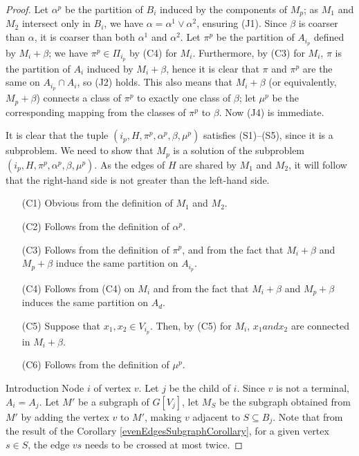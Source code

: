 \begin{proof}
Let \(\alpha^p\) be the partition of \(B_i\) induced by the components of \(M_p\); as \(M_1\) and \(M_2\) intersect only in \(B_i\), we have \(\alpha = \alpha^1 \vee \alpha^2\), ensuring (J1). Since \(\beta\) is coarser than \(\alpha\), it is coarser than both \(\alpha^1\) and \(\alpha^2\). Let \(\pi^p\) be the partition of \(A_{i_p}\) defined by \(M_i + \beta\); we have \(\pi^p \in \Pi_{i_p}\) by (C4) for \(M_i\). Furthermore, by (C3) for \(M_i\), \(\pi\) is the partition of \(A_i\) induced by \(M_i + \beta\), hence it is clear that \(\pi\) and \(\pi^p\) are the same on \(A_{i_p} \cap A_i\), so (J2) holds. This also means that \(M_i + \beta\) (or equivalently, \(M_p + \beta\)) connects a class of \(\pi^p\) to exactly one class of \(\beta\); let \(\mu^p\) be the corresponding mapping from the classes of \(\pi^p\) to \(\beta\). Now (J4) is immediate.

It is clear that the tuple \((i_p, H, \pi^p, \alpha^p, \beta, \mu^p)\) satisfies (S1)–(S5), since it is a subproblem. We need to show that \(M_p\) is a solution of the subproblem \((i_p, H, \pi^p, \alpha^p, \beta, \mu^p)\). As the edges of \(H\) are shared by \(M_1\) and \(M_2\), it will follow that the right-hand side is not greater than the left-hand side.

\begin{itemize}
    \item[(C1)] Obvious from the definition of \(M_1\) and \(M_2\).
    \item[(C2)] Follows from the definition of \(\alpha^p\).
    \item[(C3)] Follows from the definition of \(\pi^p\), and from the fact that \(M_i + \beta\) and \(M_p + \beta\) induce the same partition on \(A_{i_p}\).
    \item[(C4)] Follows from (C4) on \(M_i\) and from the fact that \(M_i + \beta\) and \(M_p + \beta\) induces the same partition on \(A_d\).
    \item[(C5)] Suppose that \(x_1, x_2 \in V_{i_p}\). Then, by (C5) for \(M_i\), \(x_1 and x_2\) are connected in \(M_i + \beta\).
    \item[(C6)] Follows from the definition of \(\mu^p\).
\end{itemize}


Introduction Node \(i\) of vertex \(v\). Let \(j\) be the child of \(i\). Since \(v\) is not a terminal, \(A_i = A_j\). Let \(M'\) be a subgraph of \(G[V_j]\), let \(M_S\) be the subgraph obtained from \(M'\) by adding the vertex \(v\) to \(M'\), making \(v\) adjacent to \(S \subseteq B_j\). Note that from the result of the Corollary \ref{evenEdgesSubgraphCorollary}, for a given vertex \(s \in S\), the edge \(vs\) needs to be crossed at most twice.


\end{proof}
